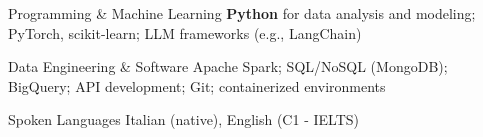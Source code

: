 


\begin{cvskills}
\cvskill
  {Programming \& Machine Learning}
  {\textbf{Python} for data analysis and modeling; PyTorch, scikit-learn; LLM frameworks (e.g., LangChain)}

\cvskill
  {Data Engineering \& Software}
  {Apache Spark; SQL/NoSQL (MongoDB); BigQuery; API development; Git; containerized environments}

  \cvskill
    {Spoken Languages} %
    {Italian (native), English (C1 - IELTS)}
\end{cvskills}
